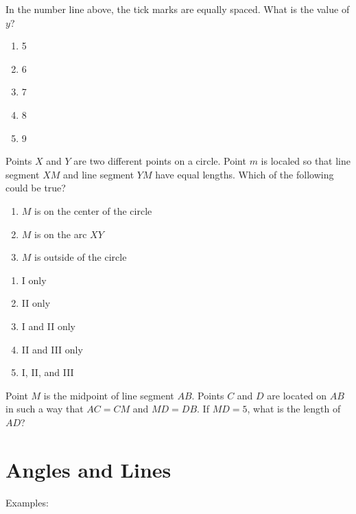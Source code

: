 \begin{multienumerate}
{In the number line above, the tick marks are equally spaced. What is the value of $y$?

\begin{enumerate}[label=(\Alph*)]
\item 5
\item 6
\item 7
\item 8
\item 9
\end{enumerate}}
{\medium

Points $X$ and $Y$ are two different points on a circle. Point $m$ is localed so that line segment $XM$ and line segment $YM$ have equal lengths. Which of the following could be true?

\begin{enumerate}[label=\Roman*.]
\item $M$ is on the center of the circle
\item $M$ is on the arc $XY$
\item $M$ is outside of the circle
\end{enumerate}

\begin{enumerate}[label=(\Alph*)]
\item I only
\item II only
\item I and II only
\item II and III only
\item I, II, and III
\end{enumerate}}

\vfill
{}
{\advanced

Point $M$ is the midpoint of line segment $AB$. Points $C$ and $D$ are located on $AB$ in such a way that $AC=CM$ and $MD=DB$. If $MD=5$, what is the length of $AD$?}
\end{multienumerate}

\vfill
\newpage
\section{Angles and Lines}

\bigskip
Examples:

